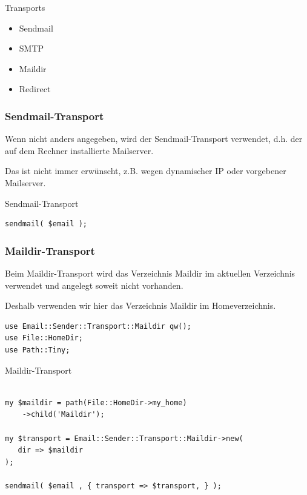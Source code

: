 \begin{frame}{Transports}
  \begin{itemize}
    \item Sendmail
    \item SMTP
    \item Maildir
    \item Redirect
  \end{itemize}
\end{frame}

\subsubsection{Sendmail-Transport}

Wenn nicht anders angegeben, wird der Sendmail-Transport verwendet, d.h. der
auf dem Rechner installierte Mailserver.

Das ist nicht immer erwünscht, z.B. wegen dynamischer IP oder vorgebener
Mailserver.

\begin{frame}[fragile]{Sendmail-Transport}
\begin{verbatim}
sendmail( $email );
\end{verbatim}
\end{frame}

\subsubsection{Maildir-Transport}

Beim Maildir-Transport wird das Verzeichnis Maildir im aktuellen Verzeichnis
verwendet und angelegt soweit nicht vorhanden.

Deshalb verwenden wir hier das Verzeichnis Maildir im Homeverzeichnis.

\begin{lstlisting}
use Email::Sender::Transport::Maildir qw();
use File::HomeDir;
use Path::Tiny;
\end{lstlisting}

\begin{frame}[fragile]{Maildir-Transport}
  \begin{verbatim}

my $maildir = path(File::HomeDir->my_home)
    ->child('Maildir');

my $transport = Email::Sender::Transport::Maildir->new(
   dir => $maildir
);

sendmail( $email , { transport => $transport, } );

\end{verbatim}
\end{frame}

